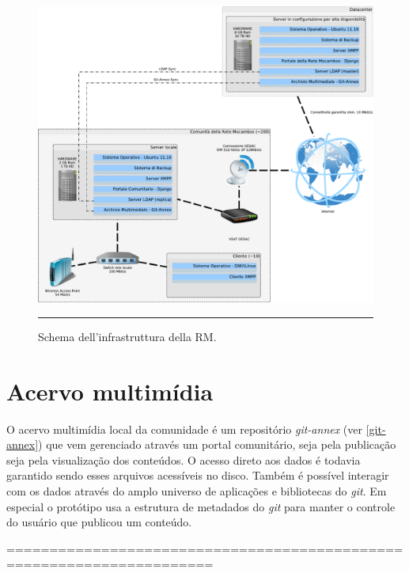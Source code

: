 \begin{figure}[htbp]
  \centering
  \includegraphics[width=\textwidth]{./Figure/SchemaServer_ReteMocambos-crop.pdf}
  \rule{35em}{0.5pt}
  \caption[Schema dell'infrastruttura della RM]{Schema dell'infrastruttura della RM.}
  \label{fig:SchemaServer_ReteMocambos}
\end{figure}

\section{Acervo multimídia}
O acervo multimídia local da comunidade é um repositório
\emph{git-annex} (ver \ref{git-annex}) que vem gerenciado através um
portal comunitário, seja pela publicação seja pela visualização dos
conteúdos. O acesso direto aos dados é todavia garantido sendo esses
arquivos acessíveis no disco. Também é possível interagir com os dados
através do amplo universo de aplicações e bibliotecas do
\emph{git}. Em especial o protótipo usa a estrutura de metadados do
\emph{git} para manter o controle do usuário que publicou um
conteúdo. 

======================================================================


